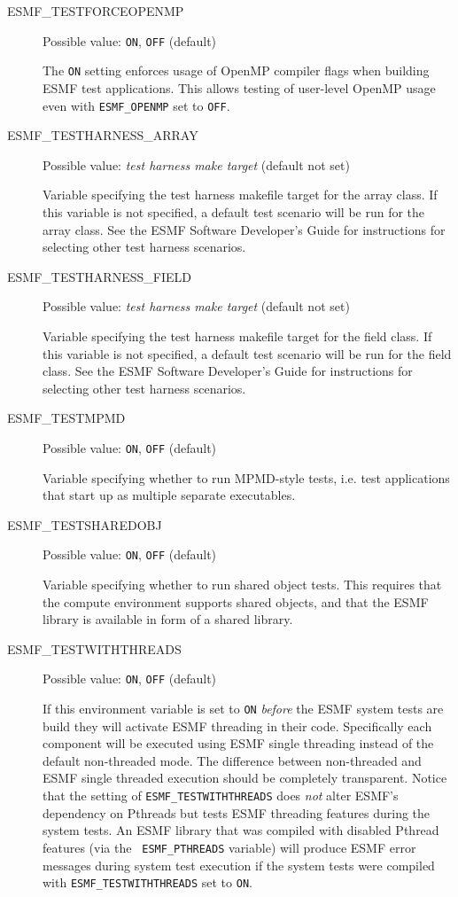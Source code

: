 \begin{description}
\item[ESMF\_TESTFORCEOPENMP] 
Possible value: {\tt ON}, {\tt OFF} (default)

The {\tt ON} setting enforces usage of OpenMP compiler flags when building ESMF test applications. This allows testing of user-level OpenMP usage even with {\tt ESMF\_OPENMP} set to {\tt OFF}.

\item[ESMF\_TESTHARNESS\_ARRAY]
Possible value: {\em test harness make target} (default not set)

Variable specifying the test harness makefile target for the array class.  If this variable is not specified, a default test scenario will be run for the array class.  See the ESMF Software Developer's Guide for instructions for selecting other test harness scenarios.

\item[ESMF\_TESTHARNESS\_FIELD]
Possible value: {\em test harness make target} (default not set)

Variable specifying the test harness makefile target for the field class.  If this variable is not specified, a default test scenario will be run for the field class.  See the ESMF Software Developer's Guide for instructions for selecting other test harness scenarios.

\item[ESMF\_TESTMPMD] 
Possible value: {\tt ON}, {\tt OFF} (default)

Variable specifying whether to run MPMD-style tests, i.e. test applications
that start up as multiple separate executables.

\item[ESMF\_TESTSHAREDOBJ]
Possible value: {\tt ON}, {\tt OFF} (default)

Variable specifying whether to run shared object tests. This requires that the compute environment supports shared objects, and that the ESMF library is available in form of a shared library.

\item[ESMF\_TESTWITHTHREADS]
Possible value: {\tt ON}, {\tt OFF} (default)

If this environment variable is set to {\tt ON} {\em before} the ESMF system
tests are build they will activate ESMF threading in their code. Specifically
each component will be executed using ESMF single threading instead of the
default non-threaded mode. The difference between non-threaded and ESMF
single threaded execution should be completely transparent. Notice that the
setting of {\tt ESMF\_TESTWITHTHREADS} does {\em not} alter ESMF's dependency
on Pthreads but tests ESMF threading features during the system tests. An
ESMF library that was compiled with disabled Pthread features (via the {\tt
ESMF\_PTHREADS} variable) will produce ESMF error messages during system test
execution if the system tests were compiled with {\tt ESMF\_TESTWITHTHREADS}
set to {\tt ON}.


\end{description}
